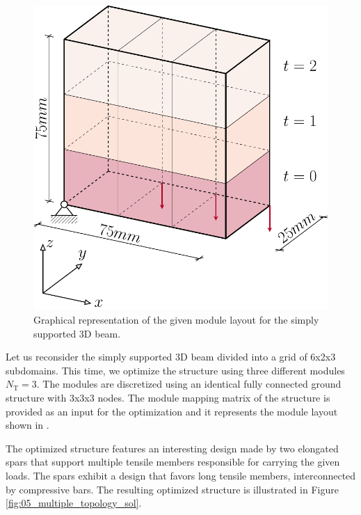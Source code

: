 \begin{figure}
    \centering
    \includegraphics[width=0.6\linewidth]{figures/05_cellular_opt/00_mutiple_bc/supported_3D_symm.pdf}
    \caption{Graphical representation of the given module layout for the simply supported 3D beam.}
    \label{fig:05_mutiple_bc}
\end{figure}

Let us reconsider the simply supported 3D beam divided into a grid of 6x2x3 subdomains. This time, we optimize the structure using three different modules $N_\text{T}=3$. The modules are discretized using an identical fully connected ground structure with 3x3x3 nodes. The module mapping matrix of the structure is provided as an input for the optimization
and it represents the module layout shown in . 

The optimized structure features an interesting design made by two elongated spars that support multiple tensile members responsible for carrying the given loads. The spars exhibit a design that favors long tensile members, interconnected by compressive bars. The resulting optimized structure is illustrated in Figure \ref{fig:05_multiple_topology_sol}.

